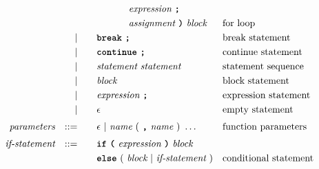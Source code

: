 \begin{alignat*}{9}
&&                       &&     &\quad && \ \ \ \ \ \ \ \ \ \ \textit{expression} \ \textbf{\texttt{;}} \\
&&                       &&     &\quad && \ \ \ \ \ \ \ \ \ \ \textit{assignment} \ \textbf{\texttt{)}} \ 
                                            \textit{block}
                                                           && \textrm{for loop}\\
&&                       && |   &\quad && \textbf{\texttt{break}}\ \textbf{\texttt{;}}
                                                           && \textrm{break statement}\\
&&                       && |   &\quad && \textbf{\texttt{continue}}\ \textbf{\texttt{;}}
                                                           && \textrm{continue statement}\\
&&                       && |   &\quad &&  \textit{statement} \ 
                                    \textit{statement}     && \textrm{statement sequence} \\
&&                       && |   &\quad &&  \textit{block} 
                                                           && \textrm{block statement}\\
&&                       && |   &\quad &&  \textit{expression} \ \textbf{\texttt{;}}
                                                           && \textrm{expression statement} \\
&&                       && |   &\quad &&  \epsilon
                                                           && \textrm{empty statement} \\[1mm] 
&& \textit{parameters}   && ::= &\quad &&  \epsilon\ | \  \textit{name} \ 
                                                   (\ \textbf{\texttt{,}} \ \textit{name}\ )\ \ldots
                                                            && \textrm{function parameters}   \\[1mm]
&& \textit{if-statement} && ::= &\quad &&  \textbf{\texttt{if}}\
                                   \textbf{\texttt{(}}\ \textit{expression} \ \textbf{\texttt{)}}\ 
                                   \textit{block} \\
&&                       &&     &      && \textbf{\texttt{else}}\
                                          (\ \textit{block}
                                          \ | \
                                          \textit{if-statement} \ )
                                                            && \textrm{conditional statement}   \\[1mm]

\end{alignat*}
